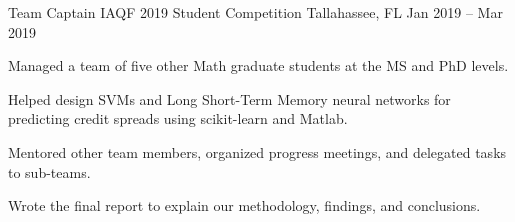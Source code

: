 



\begin{cventries}


    \cventry
    {Team Captain} %
    {IAQF 2019 Student Competition} %
    {Tallahassee, FL} %
    {Jan 2019 -- Mar 2019} %
    {
        \begin{cvitems} %
        \item{Managed a team of five other Math graduate students at the MS and PhD levels.}
        \item{Helped design SVMs and Long Short-Term Memory neural networks for predicting credit spreads using scikit-learn and Matlab.}
        \item{Mentored other team members, organized progress meetings, and delegated tasks to sub-teams.}
        \item{Wrote the final report to explain our methodology, findings, and conclusions.}
        \end{cvitems}
    }


\end{cventries}
